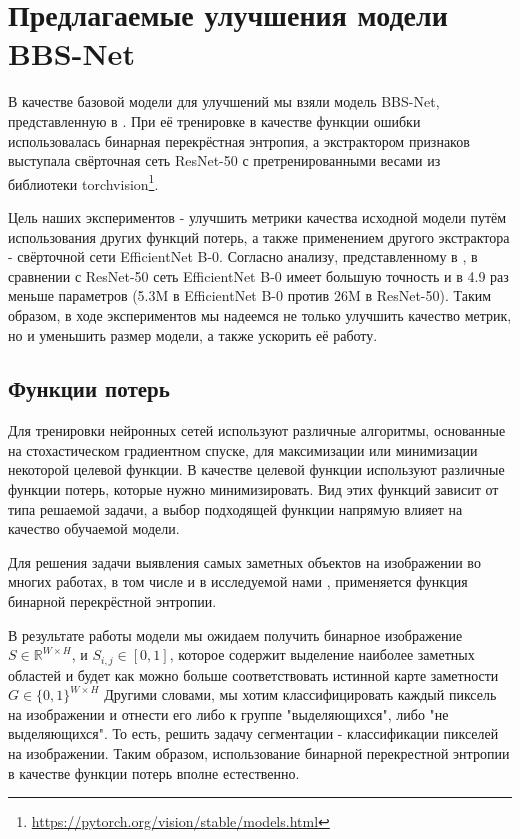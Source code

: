 \section{Предлагаемые улучшения модели BBS-Net}

В качестве базовой модели для улучшений мы взяли модель BBS-Net, представленную в \cite{BBS}.
При её тренировке в качестве функции ошибки использовалась  бинарная перекрёстная энтропия,
а экстрактором признаков выступала свёрточная сеть ResNet-50\cite{ResNet}
с претренированными весами из библиотеки torchvision\footnote{\url{https://pytorch.org/vision/stable/models.html}}.

Цель наших экспериментов - улучшить метрики качества исходной модели путём использования
других функций потерь, а также применением другого экстрактора - свёрточной сети EfficientNet B-0\cite{Efficientnet}.
Согласно анализу, представленному в \cite{Efficientnet}, в сравнении с ResNet-50 сеть EfficientNet B-0 имеет большую точность
и в 4.9 раз меньше параметров (5.3M в EfficientNet B-0 против 26M в ResNet-50).
Таким образом, в ходе экспериментов мы надеемся не только улучшить качество метрик,
но и уменьшить размер модели, а также ускорить её работу.


\subsection{Функции потерь}

Для тренировки нейронных сетей используют различные алгоритмы, основанные на стохастическом градиентном спуске,
для максимизации или минимизации некоторой целевой функции. В качестве целевой функции используют различные функции потерь,
которые нужно минимизировать. Вид этих функций зависит от типа решаемой задачи, а выбор подходящей функции напрямую влияет на
качество обучаемой модели.

Для решения задачи выявления самых заметных объектов на изображении
во многих работах, в том числе и в исследуемой нами \cite{BBS}, применяется функция бинарной перекрёстной энтропии.

В результате работы модели мы ожидаем получить бинарное изображение $S \in \mathbb{R}^{W \times H}$, и $S_{i,j} \in [0,1]$, которое содержит
выделение наиболее заметных областей и будет как можно больше соответствовать истинной карте заметности $G \in \{0,1\}^{W \times H}$
Другими словами, мы хотим классифицировать каждый пиксель на изображении и отнести его либо к группе "выделяющихся", либо "не выделяющихся". То есть,
решить задачу сегментации - классификации пикселей на изображении. Таким образом, использование бинарной перекрестной энтропии
в качестве функции потерь вполне естественно.

